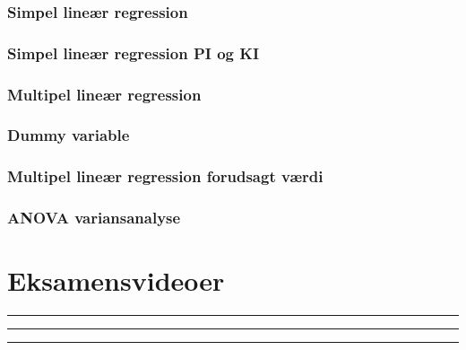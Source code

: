\documentclass[]{book}
\begin{document}
\hypertarget{simpel-liner-regression}{%
\subsubsection{Simpel lineær regression}\label{simpel-liner-regression}}

\hypertarget{simpel-liner-regression-pi-og-ki}{%
\subsubsection{Simpel lineær regression PI og
KI}\label{simpel-liner-regression-pi-og-ki}}

\hypertarget{multipel-liner-regression}{%
\subsubsection{Multipel lineær
regression}\label{multipel-liner-regression}}

\hypertarget{dummy-variable}{%
\subsubsection{Dummy variable}\label{dummy-variable}}

\hypertarget{multipel-liner-regression-forudsagt-vrdi}{%
\subsubsection{Multipel lineær regression forudsagt
værdi}\label{multipel-liner-regression-forudsagt-vrdi}}

\hypertarget{anova-variansanalyse}{%
\subsubsection{ANOVA variansanalyse}\label{anova-variansanalyse}}

\hypertarget{eksamensvideoer}{%
\section{Eksamensvideoer}\label{eksamensvideoer}}

\begin{center}\rule{0.5\linewidth}{\linethickness}\end{center}

\begin{center}\rule{0.5\linewidth}{\linethickness}\end{center}

\begin{center}\rule{0.5\linewidth}{\linethickness}\end{center}
\end{document}
